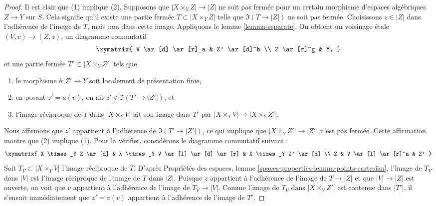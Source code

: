 \begin{proof}
Il est clair que (1) implique (2).
Supposons que $|X \times_Y Z| \to |Z|$ ne soit pas fermée pour un certain
morphisme d'espaces algébriques $Z \to Y$ sur $S$. Cela signifie qu'il
existe une partie fermée $T \subset |X \times_Y Z|$
telle que $\Im(T \to |Z|)$ ne soit pas fermée. Choisissons $z \in |Z|$
dans l'adhérence de l'image de $T$, mais non dans cette image.
Appliquons le lemme \ref{lemma-separate}.
On obtient un voisinage \'etale $(V, v) \to (Z, z)$, un diagramme commutatif
$$
\xymatrix{
V \ar[d] \ar[r]_a & Z' \ar[d]^b \\
Z \ar[r]^g & Y,
}
$$
et une partie fermée $T' \subset |X \times_Y Z'|$ tels que
\begin{enumerate}
\item le morphisme $b : Z' \to Y$ soit localement de présentation finie,
\item en posant $z' = a(v)$, on ait $z' \not \in \Im(T' \to |Z'|)$, et
\item l'image réciproque de $T$ dans $|X \times_Y V|$ ait son image dans $T'$ par
$|X \times_Y V| \to |X \times_Y Z'|$.
\end{enumerate}
Nous affirmons que $z'$ appartient à l'adhérence de $\Im(T' \to |Z'|)$,
ce qui implique que $|X \times_Y Z'| \to |Z'|$ n'est pas fermée.
Cette affirmation montre que (2) implique (1).
Pour la vérifier, considérons
le diagramme commutatif suivant :
$$
\xymatrix{
X \times_Y Z \ar[d] &
X \times_Y V \ar[l] \ar[d] \ar[r] &
X \times_Y Z' \ar[d] \\
Z & V \ar[l] \ar[r]^a & Z'
}
$$
Soit $T_V \subset |X \times_Y V|$ l'image réciproque de $T$.
D'après Propriétés des espaces, lemme \ref{spaces-properties-lemma-points-cartesian},
l'image de $T_V$ dans $|V|$ est l'image réciproque de l'image
de $T$ dans $|Z|$. Puisque $z$ appartient à l'adhérence de l'image de
$T \to |Z|$ et que $|V| \to |Z|$ est ouverte, on voit que $v$ appartient à
l'adhérence de l'image de $T_V \to |V|$. Comme l'image de
$T_V$ dans $|X \times_Y Z'|$ est contenue dans $|T'|$, il s'ensuit
immédiatement que $z' = a(v)$ appartient à l'adhérence de l'image de $T'$.


\end{proof}
